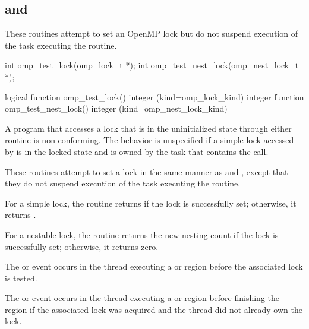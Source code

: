 \subsection{ and }
\label{subsec:omp_test_lock and omp_test_nest_lock}
\summary
These routines attempt to set an OpenMP lock but do not suspend execution of the task
executing the routine.

\format
\begin{ccppspecific}
\begin{ompcFunction}
int omp_test_lock(omp_lock_t *);
int omp_test_nest_lock(omp_nest_lock_t *);
\end{ompcFunction}
\end{ccppspecific}

\begin{fortranspecific}
\begin{ompfFunction}
logical function omp_test_lock()
integer (kind=omp_lock_kind) 
integer function omp_test_nest_lock()
integer (kind=omp_nest_lock_kind) 
\end{ompfFunction}
\end{fortranspecific}

\constraints
A program that accesses a lock that is in the uninitialized state through either routine is
non-conforming. The behavior is unspecified if a simple lock accessed by
 is in the locked state and is owned by the task that contains the call.

\effect
These routines attempt to set a lock in the same manner as  and
, except that they do not suspend execution of the task
executing the routine.

For a simple lock, the  routine returns  if the lock is successfully
set; otherwise, it returns .

For a nestable lock, the  routine returns the new nesting count
if the lock is successfully set; otherwise, it returns zero.

\events

The  or  event occurs in the thread
executing a  or  region
before the associated lock is tested.

The  or  event occurs in the thread
executing a  or  region
before finishing the region if the associated lock was acquired and the thread did not already own the lock.

